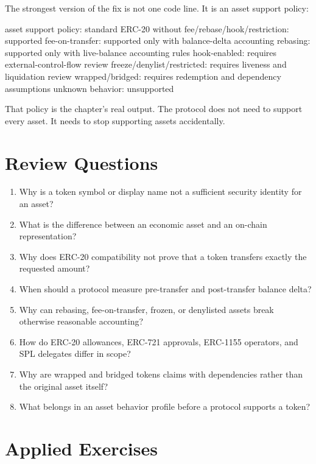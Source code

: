 The strongest version of the fix is not one code line. It is an asset support policy:

\begin{codeblock}
asset support policy:
    standard ERC-20 without fee/rebase/hook/restriction: supported
    fee-on-transfer: supported only with balance-delta accounting
    rebasing: supported only with live-balance accounting rules
    hook-enabled: requires external-control-flow review
    freeze/denylist/restricted: requires liveness and liquidation review
    wrapped/bridged: requires redemption and dependency assumptions
    unknown behavior: unsupported
\end{codeblock}

That policy is the chapter's real output. The protocol does not need to support every asset. It needs to stop supporting assets accidentally.

\section*{Review Questions}

\begin{enumerate}
\item Why is a token symbol or display name not a sufficient security identity for an asset?
\item What is the difference between an economic asset and an on-chain representation?
\item Why does ERC-20 compatibility not prove that a token transfers exactly the requested amount?
\item When should a protocol measure pre-transfer and post-transfer balance delta?
\item Why can rebasing, fee-on-transfer, frozen, or denylisted assets break otherwise reasonable accounting?
\item How do ERC-20 allowances, ERC-721 approvals, ERC-1155 operators, and SPL delegates differ in scope?
\item Why are wrapped and bridged tokens claims with dependencies rather than the original asset itself?
\item What belongs in an asset behavior profile before a protocol supports a token?
\end{enumerate}

\section*{Applied Exercises}

